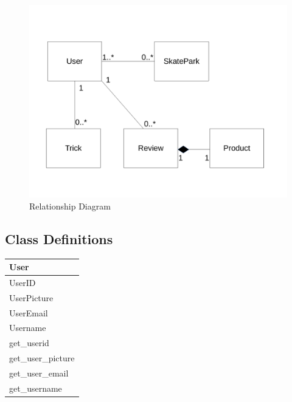 \begin{figure}[H]
    \includegraphics[width=\textwidth]{./Design/RelationshipDiagram.pdf}
    \caption{Relationship Diagram} \label{fig:Relationship Diagram}
\end{figure}

\subsection{Class Definitions}

\begin{center}
\begin{tabular}{|p{5cm}|}
    \hline
 \textbf{User} \\ \hline
UserID\\
UserPicture \\
UserEmail \\
Username \\ \hline
get\_userid \\
get\_user\_picture \\
get\_user\_email \\
get\_username \\
 \hline 
\end{tabular}
\label{tab:User Class Definition}
\end{center}


